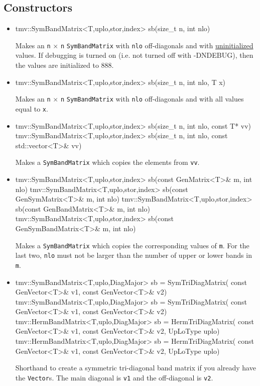 \documentclass[twoside,letterpaper,11pt]{article}
\renewcommand{\tt}[1]{{\lstinline {#1}}}
\begin{document}
\subsection{Constructors}
\label{SymBandMatrix_Constructors}

\begin{itemize}
\item 
\begin{tmvcode}
tmv::SymBandMatrix<T,uplo,stor,index> sb(size_t n, int nlo)
\end{tmvcode}
Makes an \tt{n} $\times$ \tt{n} \tt{SymBandMatrix} with 
\tt{nlo} off-diagonals
and with \underline{uninitialized} values.
If debugging is turned on (i.e. not turned off 
with -DNDEBUG), then the values are initialized to 888.

\item
\begin{tmvcode}
tmv::SymBandMatrix<T,uplo,stor,index> sb(size_t n, int nlo, T x)
\end{tmvcode}
Makes an \tt{n} $\times$ \tt{n} \tt{SymBandMatrix} with \tt{nlo} off-diagonals
and with all values equal to \tt{x}.

\item
\begin{tmvcode}
tmv::SymBandMatrix<T,uplo,stor,index> sb(size_t n, int nlo, 
      const T* vv)
tmv::SymBandMatrix<T,uplo,stor,index> sb(size_t n, int nlo, 
      const std::vector<T>& vv)
\end{tmvcode}
Makes a \tt{SymBandMatrix} which copies the elements from \tt{vv}.  

\item 
\begin{tmvcode}
tmv::SymBandMatrix<T,uplo,stor,index> sb(const GenMatrix<T>& m, 
      int nlo)
tmv::SymBandMatrix<T,uplo,stor,index> sb(const GenSymMatrix<T>& m, 
      int nlo)
tmv::SymBandMatrix<T,uplo,stor,index> sb(const GenBandMatrix<T>& m, 
      int nlo)
tmv::SymBandMatrix<T,uplo,stor,index> sb(const GenSymBandMatrix<T>& m, 
      int nlo)
\end{tmvcode}
Makes a \tt{SymBandMatrix} which copies the corresponding values of \tt{m}.  
For the last two, \tt{nlo} must not be larger than the number of upper
or lower bands in \tt{m}.

\item
\begin{tmvcode}
tmv::SymBandMatrix<T,uplo,DiagMajor> sb = SymTriDiagMatrix(
      const GenVector<T>& v1, const GenVector<T>& v2)
tmv::SymBandMatrix<T,uplo,DiagMajor> sb = SymTriDiagMatrix(
      const GenVector<T>& v1, const GenVector<T>& v2)
tmv::HermBandMatrix<T,uplo,DiagMajor> sb = HermTriDiagMatrix(
      const GenVector<T>& v1, const GenVector<T>& v2, 
      UpLoType uplo)
tmv::HermBandMatrix<T,uplo,DiagMajor> sb = HermTriDiagMatrix(
      const GenVector<T>& v1, const GenVector<T>& v2, 
      UpLoType uplo)
\end{tmvcode}
Shorthand to create a symmetric tri-diagonal band matrix
if you already have the \tt{Vector}s.  
The main diagonal is \tt{v1} and the off-diagonal is \tt{v2}.


\end{itemize}
\end{document}
